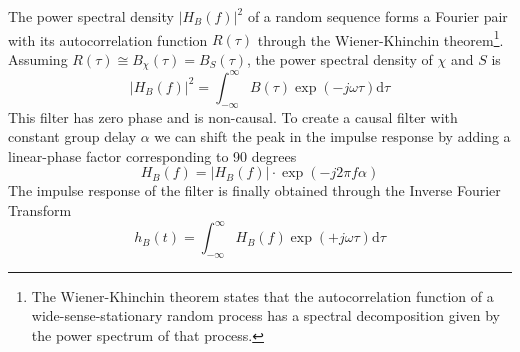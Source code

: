 The power spectral density $|H_B(f)|^2$ of a random sequence forms a Fourier pair
with its autocorrelation function $R(\tau)$ through the Wiener-Khinchin
theorem\footnote{The Wiener-Khinchin theorem states that the autocorrelation
function of a wide-sense-stationary random process has a spectral decomposition
given by the power spectrum of that process.}. Assuming $R(\tau) \cong B_{\chi}(\tau)=B_{S}(\tau)$,
the power spectral density of $\chi$ and $S$ is
\begin{equation}
 |H_B(f)|^2 = \int_{-\infty}^{\infty} B(\tau) \exp{\left(-j\omega \tau\right)} \mathrm{d}\tau
\end{equation}
This filter has zero phase and is non-causal. To create a causal filter
with constant group delay $\alpha$ we can shift the peak in the impulse response
by adding a linear-phase factor corresponding to 90 degrees
\begin{equation}
 H_B(f) = |H_B(f)|  \cdot \exp{\left(-j 2\pi f \alpha\right)}
\end{equation}
The impulse response of the filter is finally obtained through the Inverse Fourier Transform
\begin{equation}
 h_B(t) = \int_{-\infty}^{\infty} H_B(f) \exp{\left(+j\omega \tau\right)} \mathrm{d}\tau
\end{equation}

